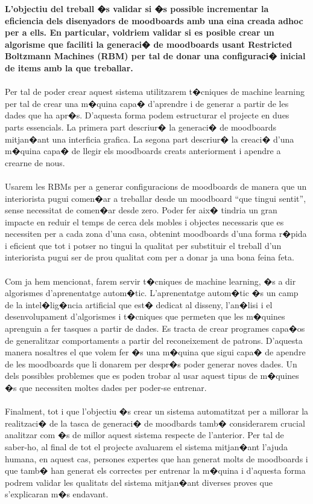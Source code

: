 \documentclass[12pt,a4paper,openright,oneside]{article}
\numberwithin{equation}{section}
\theoremstyle{definition}
\begin{document}
{\bf L'objectiu del treball �s validar si �s possible incrementar la eficiencia dels disenyadors de moodboards amb una eina creada adhoc per a ells. En particular, voldriem validar si es posible crear un algorisme que faciliti la generaci� de moodboards usant Restricted Boltzmann Machines (RBM) per tal de donar una configuraci� inicial de items amb la que treballar. }
\\\\
Per tal de poder crear aquest sistema utilitzarem t�cniques de machine learning per tal de crear una m�quina capa� d'aprendre i de generar a partir de les dades que ha apr�s. D'aquesta forma podem estructurar el projecte en dues parts essencials. La primera part descriur�  la generaci� de moodboards mitjan�ant una interficia grafica. La segona  part descriur� la creaci� d'una m�quina capa� de llegir els moodboards creats anteriorment i apendre a crearne de nous. 
\\\\
Usarem les  RBMs per a generar configuracions de moodboards de manera que un interiorista pugui comen�ar a treballar desde un moodboard ``que tingui sentit'', sense necessitat de comen�ar desde zero. Poder fer aix� tindria un gran impacte en reduir el temps de cerca dels mobles i objectes necessaris que es necessiten per a cada zona d'una casa, obtenint  moodboards d'una forma r�pida i eficient que tot i potser no tingui la qualitat per substituir el treball d'un interiorista pugui ser de prou qualitat com per a donar ja una bona feina feta.
\\\\
Com ja hem mencionat, farem servir t�cniques de machine learning, �s a dir algorismes d'aprenentatge autom�tic. 
L'aprenentatge autom�tic �s un camp de la intel�lig�ncia artificial que est� dedicat al disseny, l'an�lisi i el desenvolupament d'algorismes i t�cniques que permeten que les m�quines aprenguin a fer tasques a partir de dades. Es tracta de crear programes capa�os de generalitzar comportaments a partir del reconeixement de patrons.  D'aquesta manera nosaltres el que volem fer �s una m�quina que sigui capa� de apendre de les moodboards que li donarem per despr�s poder generar  noves dades. Un dels possibles problemes que es poden trobar al usar aquest tipus de m�quines �s que necessiten moltes dades per poder-se entrenar.\\\\
Finalment, tot i que l'objectiu �s crear un sistema automatitzat per a millorar la realitzaci� de la tasca de generaci� de moodbards tamb� considerarem crucial analitzar com �s de millor aquest sistema respecte de l'anterior. Per tal de saber-ho, al final de tot el projecte avaluarem el sistema mitjan�ant l'ajuda humana, en aquest cas, persones expertes que han generat molts de moodboards i que tamb� han generat els correctes per entrenar la m�quina i d'aquesta forma podrem validar les qualitats del sistema mitjan�ant diverses proves que s'explicaran m�s endavant.
\\\
\newpage
\end{document}
